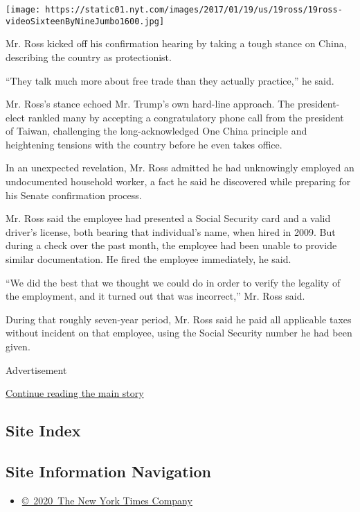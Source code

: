 \texttt{[image: https://static01.nyt.com/images/2017/01/19/us/19ross/19ross-videoSixteenByNineJumbo1600.jpg]}

Mr. Ross kicked off his confirmation hearing by taking a tough stance on
China, describing the country as protectionist.

``They talk much more about free trade than they actually practice,'' he
said.

Mr. Ross's stance echoed Mr. Trump's own hard-line approach. The
president-elect rankled many by accepting a congratulatory phone call
from the president of Taiwan, challenging the long-acknowledged One
China principle and heightening tensions with the country before he even
takes office.

In an unexpected revelation, Mr. Ross admitted he had unknowingly
employed an undocumented household worker, a fact he said he discovered
while preparing for his Senate confirmation process.

Mr. Ross said the employee had presented a Social Security card and a
valid driver's license, both bearing that individual's name, when hired
in 2009. But during a check over the past month, the employee had been
unable to provide similar documentation. He fired the employee
immediately, he said.

``We did the best that we thought we could do in order to verify the
legality of the employment, and it turned out that was incorrect,'' Mr.
Ross said.

During that roughly seven-year period, Mr. Ross said he paid all
applicable taxes without incident on that employee, using the Social
Security number he had been given.

Advertisement

\protect\hyperlink{after-bottom}{Continue reading the main story}

\hypertarget{site-index}{%
\subsection{Site Index}\label{site-index}}

\hypertarget{site-information-navigation}{%
\subsection{Site Information
Navigation}\label{site-information-navigation}}

\begin{itemize}
\tightlist
\item
  \href{https://help.nytimes.com/hc/en-us/articles/115014792127-Copyright-notice}{©~2020~The
  New York Times Company}
\end{itemize}

